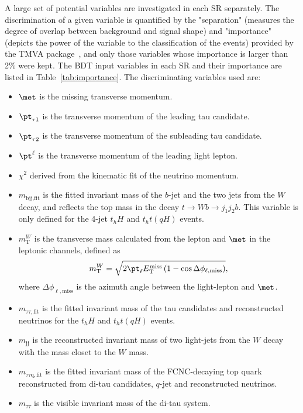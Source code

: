 \documentclass[PAPER, coverpage, atlasdraft=true, texlive=2016, UKenglish]{\ATLASLATEXPATH atlasdoc}
\providecommand{\DIFadd}[1]{{\protect\color{blue}\uwave{#1}}} %
\providecommand{\DIFaddbegin}{} %
\providecommand{\DIFaddend}{} %
\begin{document}
A large set of potential variables are investigated in each SR separately. The discrimination of a given variable is quantified by the "separation" (measures the degree of overlap between background and signal shape) and "importance" (depicts the power of the variable to the classification of the events) provided by the TMVA package~\cite{Hocker:2007ht}, and only those variables whose importance is larger than 2\% were kept.
The BDT input variables in each SR and their importance are listed in Table~\ref{tab:importance}. The discriminating variables used are:
\begin{itemize}
\item $\met$ is the missing transverse momentum.
\item ${\pt}_{\tau1} $ is the transverse momentum of the leading tau candidate.
\item ${\pt}_{\tau2}$ is the transverse momentum of the subleading tau candidate.
\item ${\pt}^{\ell}$ is the transverse momentum of the leading light lepton.
\item $\chi^2$ derived from the kinematic fit of the neutrino momentum.
\item $m_{\text{bjj},\text{fit}}$ is the fitted invariant mass of the $b$-jet and the two jets from the $W$ \DIFaddbegin \DIFadd{boson }\DIFaddend decay, and reflects the top mass in the decay $t\to Wb \to j_1j_2b$. This variable is only defined for the 4-jet $t_hH$ and $t_ht(qH)$ events.
\item $m^{W}_{\text{T}}$ is the transverse mass calculated from the lepton and $\met$ in the leptonic channels, defined as
\begin{equation}
m^{W}_{\text{T}} = \sqrt{2 {\pt}_{\ell} E_{\text{T}}^{\text{miss}} \left(1-\cos\Delta\phi_{\ell,\text{miss}} \right)},  
\end{equation}
where $\Delta\phi_{\ell,\text{miss}}$ is the azimuth angle between the light-lepton and $\met$.  
\item $m_{\tau\tau,\text{fit}}$ is the fitted invariant mass of the tau candidates and reconstructed neutrinos for the $t_hH$ and $t_ht(qH)$ events. 
\item $m_{\text{jj}}$ is the reconstructed invariant mass of two light-jets from the $W$ decay with the mass closet to the $W$ mass.
\item $m_{\tau\tau\text{q},\text{fit}}$ is the fitted invariant mass of the FCNC-decaying top quark reconstructed from di-tau candidates, $q$-jet and reconstructed neutrinos.
\item $m_{\tau\tau}$ is the visible invariant mass of the di-tau system. %

\end{itemize}
\end{document}
